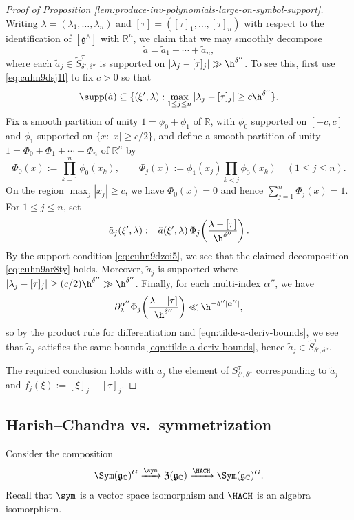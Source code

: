 \begin{proof}[Proof of Proposition \ref{lem:produce-inv-polynomials-large-on-symbol-support}]
  Writing \(\lambda = (\lambda_1,\dotsc,\lambda_n)\) and \([\tau] = ([\tau]_1,\dotsc,[\tau]_n)\) with respect to the identification of \([\mathfrak{g}^\wedge]\) with \(\mathbb{R}^n\), we claim that we may smoothly decompose
  \begin{equation}\label{eq:cuhn9ar8ty}
    \tilde{a} = \tilde{a}_1 + \dotsb + \tilde{a}_n,
  \end{equation}
  where each \(\tilde{a}_j \in \tilde{S}^{\tau}_{\delta ', \delta ''}\) is supported on \(|\lambda_j - [\tau]_j| \gg \h^{\delta ''}\).  To see this, first use \eqref{eq:cuhn9dsj1l} to fix \(c>0\) so that
  \begin{equation}\label{eq:cuhn9dzoi5}
    \supp(\tilde{a}) \subseteq \{(\xi ',\lambda) : \max_{1 \leq j \leq n} |\lambda_j - [\tau]_j| \geq c \h^{\delta ''}\}.
  \end{equation}
  Fix a smooth partition of unity \(1=\phi_0+\phi_1\) of \(\mathbb{R}\), with \(\phi_0\) supported on \([-c,c]\) and \(\phi_1\) supported on \(\{x : |x| \geq c/2\}\), and define a smooth partition of unity $1 = \Phi_0 + \Phi_1 + \dotsb + \Phi_n$ of \(\mathbb{R}^n\) by
  \[
    \Phi_0(x) := \prod_{k=1}^n \phi_0(x_k), \qquad
    \Phi_j(x) := \phi_1(x_j) \prod_{k<j} \phi_0(x_k) \quad (1 \leq j \leq n).
  \]
  On the region \(\max_j |x_j| \geq c\), we have \(\Phi_0(x)=0\) and hence \(\sum_{j=1}^n \Phi_j(x)=1\).  For \(1 \leq j \leq n\), set
  \[
    \tilde{a}_j(\xi ',\lambda) := \tilde{a}(\xi ',\lambda)\,\Phi_j\!\left(\frac{\lambda-[\tau]}{\h^{\delta ''}}\right).
  \]
  By the support condition \eqref{eq:cuhn9dzoi5}, we see that the claimed decomposition \eqref{eq:cuhn9ar8ty} holds.  Moreover, \(\tilde{a}_j\) is supported where \(|\lambda_j-[\tau]_j| \geq (c/2)\h^{\delta ''} \gg \h^{\delta ''}\).  Finally, for each multi-index \(\alpha''\), we have
  \[
    \partial_\lambda^{\alpha''}\Phi_j\!\left(\frac{\lambda-[\tau]}{\h^{\delta ''}}\right) \ll \h^{-\delta ''|\alpha''|},
  \]
  so by the product rule for differentiation and \eqref{eqn:tilde-a-deriv-bounds}, we see that \(\tilde{a}_j\) satisfies the same bounds \eqref{eqn:tilde-a-deriv-bounds}, hence \(\tilde{a}_j \in \tilde{S}^{\tau}_{\delta ', \delta ''}\).

  The required conclusion holds with $a_j$ the element of $S^{\tau}_{\delta ', \delta ''}$ corresponding to $\tilde{a}_j$ and $f_j(\xi) := [\xi]_j - [\tau]_j$.
\end{proof}

\subsection{Harish--Chandra vs.\ symmetrization}\label{sec:harish-chandra-vs}
Consider the composition
\begin{equation}\label{eqn:HACH-sym}
  \Sym(\mathfrak{g}_\mathbb{C})^G
  \xrightarrow{\sym} \mathfrak{Z}(\mathfrak{g}_\mathbb{C})
  \xrightarrow{\HACH}
  \Sym(\mathfrak{g}_\mathbb{C})^G.
\end{equation}
Recall that $\sym$ is a vector space isomorphism and $\HACH$ is an algebra isomorphism.

